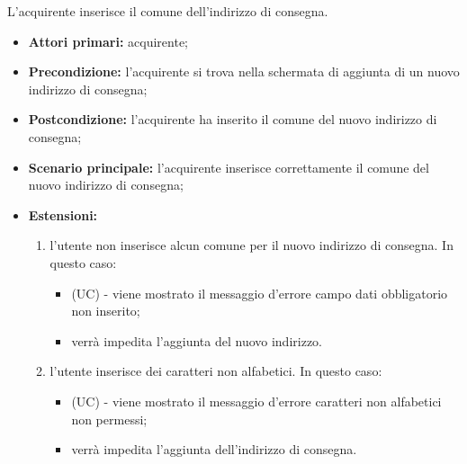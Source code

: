 L'acquirente inserisce il comune dell'indirizzo di consegna.
\begin{itemize}
    \item \textbf{Attori primari:} acquirente;
    \item \textbf{Precondizione:} l'acquirente si trova nella schermata di aggiunta di un nuovo indirizzo di consegna;
    \item \textbf{Postcondizione:} l'acquirente ha inserito il comune del nuovo indirizzo di consegna;
    \item \textbf{Scenario principale:} l'acquirente inserisce correttamente il comune del nuovo indirizzo di consegna;
    \item \textbf{Estensioni:}
    \begin{enumerate}[label=\lett]
        \item l'utente non inserisce alcun comune per il nuovo indirizzo di consegna. In questo caso:
        \begin{itemize}
            \item (UC) - viene mostrato il messaggio d'errore campo dati obbligatorio non inserito;
            \item verrà impedita l'aggiunta del nuovo indirizzo.
        \end{itemize}
        \item l'utente inserisce dei caratteri non alfabetici. In questo caso:
        \begin{itemize}
            \item (UC) - viene mostrato il messaggio d'errore caratteri non alfabetici non permessi;
            \item verrà impedita l'aggiunta dell'indirizzo di consegna.
        \end{itemize}
    \end{enumerate}
\end{itemize}

